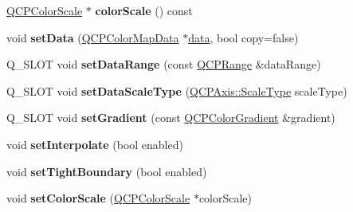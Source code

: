 \begin{DoxyCompactItemize}
\item 
\hyperlink{class_q_c_p_color_scale}{Q\+C\+P\+Color\+Scale} $\ast$ {\bfseries color\+Scale} () const \hypertarget{class_q_c_p_color_map_a6bd82e0b042a2ec4d64f40853a3b05e3}{}\label{class_q_c_p_color_map_a6bd82e0b042a2ec4d64f40853a3b05e3}

\item 
void {\bfseries set\+Data} (\hyperlink{class_q_c_p_color_map_data}{Q\+C\+P\+Color\+Map\+Data} $\ast$\hyperlink{class_q_c_p_color_map_a3ae12c9ce842352037cd20ea5267414f}{data}, bool copy=false)\hypertarget{class_q_c_p_color_map_a5a23e133a20c4ccad35fd32e6c0f9809}{}\label{class_q_c_p_color_map_a5a23e133a20c4ccad35fd32e6c0f9809}

\item 
Q\+\_\+\+S\+L\+OT void {\bfseries set\+Data\+Range} (const \hyperlink{class_q_c_p_range}{Q\+C\+P\+Range} \&data\+Range)\hypertarget{class_q_c_p_color_map_adffa7d847989fc47d0e125ddecffdc07}{}\label{class_q_c_p_color_map_adffa7d847989fc47d0e125ddecffdc07}

\item 
Q\+\_\+\+S\+L\+OT void {\bfseries set\+Data\+Scale\+Type} (\hyperlink{class_q_c_p_axis_a36d8e8658dbaa179bf2aeb973db2d6f0}{Q\+C\+P\+Axis\+::\+Scale\+Type} scale\+Type)\hypertarget{class_q_c_p_color_map_a3e8981d25045fc443d6ddb1a3ba0db37}{}\label{class_q_c_p_color_map_a3e8981d25045fc443d6ddb1a3ba0db37}

\item 
Q\+\_\+\+S\+L\+OT void {\bfseries set\+Gradient} (const \hyperlink{class_q_c_p_color_gradient}{Q\+C\+P\+Color\+Gradient} \&gradient)\hypertarget{class_q_c_p_color_map_acd6260526faee58f13af48768527c7d9}{}\label{class_q_c_p_color_map_acd6260526faee58f13af48768527c7d9}

\item 
void {\bfseries set\+Interpolate} (bool enabled)\hypertarget{class_q_c_p_color_map_a484eaa8a5065cfc386b15375bf98b964}{}\label{class_q_c_p_color_map_a484eaa8a5065cfc386b15375bf98b964}

\item 
void {\bfseries set\+Tight\+Boundary} (bool enabled)\hypertarget{class_q_c_p_color_map_ad03221cc285e5f562a0b13d684b5576d}{}\label{class_q_c_p_color_map_ad03221cc285e5f562a0b13d684b5576d}

\item 
void {\bfseries set\+Color\+Scale} (\hyperlink{class_q_c_p_color_scale}{Q\+C\+P\+Color\+Scale} $\ast$color\+Scale)\hypertarget{class_q_c_p_color_map_aa828921db364fe3c6af4619580ab85fd}{}\label{class_q_c_p_color_map_aa828921db364fe3c6af4619580ab85fd}


\end{DoxyCompactItemize}
